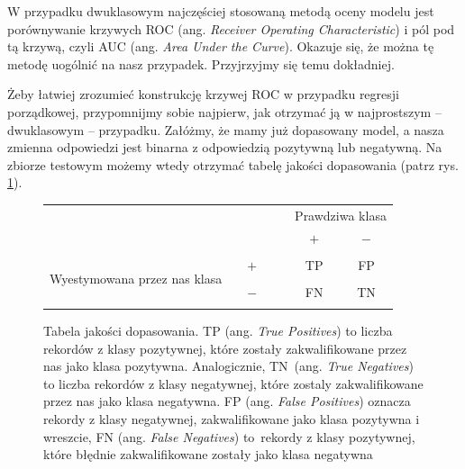 \documentclass{mini}
\begin{document}
W przypadku dwuklasowym najczęściej stosowaną metodą oceny modelu jest porównywanie krzywych ROC (ang. \textit{Receiver Operating Characteristic}) i pól pod tą krzywą, czyli AUC (ang. \textit{Area Under the Curve}). Okazuje się, że można tę metodę uogólnić na nasz przypadek. Przyjrzyjmy się temu dokładniej. 

Żeby łatwiej zrozumieć konstrukcję krzywej ROC w przypadku regresji porządkowej, przypomnijmy sobie najpierw, jak otrzymać ją w najprostszym -- dwuklasowym -- przypadku. Załóżmy, że mamy już dopasowany model, a nasza zmienna odpowiedzi jest binarna z odpowiedzią pozytywną lub negatywną. Na zbiorze testowym możemy wtedy otrzymać tabelę jakości dopasowania (patrz rys. \ref{tabeladopasowania}).

\begin{figure}[!h]
		\begin{center}
		\begin{tabular}{c c c c | | c c c} 
			& & & & & \multicolumn{2}{c}{ Prawdziwa klasa}\\ 
			& & & & & $+$ & $-$ \\
			\hline
			\hline
			& & & & & & \\
			\multirow{3}{*}{\parbox{4cm}{\centering  Wyestymowana przez nas klasa}}
			& & $+$ & & & TP & FP\\
			& & & & &\\
			& & $-$ & & & FN & TN\\
			& & & & & &
		\end{tabular}
		\end{center}
	\caption{Tabela jakości dopasowania. TP (ang. \textit{True Positives}) to liczba rekordów z klasy pozytywnej, które zostały zakwalifikowane przez nas jako klasa pozytywna. Analogicznie, TN~(ang. \textit{True Negatives}) to liczba rekordów z klasy negatywnej, które zostaly zakwalifikowane przez nas jako klasa negatywna. FP (ang. \textit{False Positives}) oznacza rekordy z klasy negatywnej, zakwalifikowane jako klasa pozytywna i wreszcie, FN (ang. \textit{False Negatives}) to~rekordy z klasy pozytywnej, które błędnie zakwalifikowane zostały jako klasa negatywna}
\label{tabeladopasowania}	
\end{figure}
\end{document}
